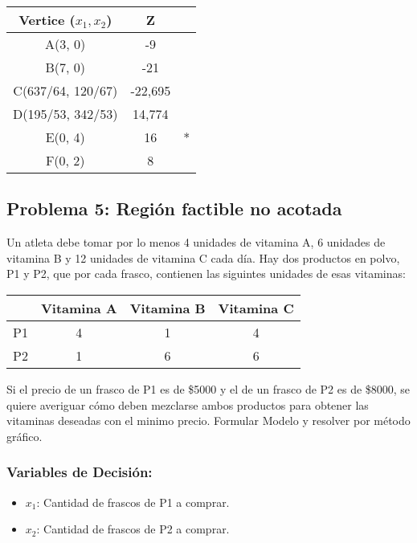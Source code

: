 \documentclass{templateNote}
\begin{document}
\begin{center}
    \begin{tabular}{|c|c|c|}
        \hline
        \textbf{Vertice ($x_1,x_2$)} & Z &  \\ \hline
        A(3, 0) & -9 & \\ \hline
        B(7, 0) & -21 & \\ \hline
        C(637/64, 120/67) & -22,695 & \\ \hline
        D(195/53, 342/53) & 14,774 & \\ \hline
        E(0, 4) & 16 & * \\ \hline
        F(0, 2) & 8 & \\ \hline
    \end{tabular}
\end{center}

\newpage
\subsection*{Problema 5: Región factible no acotada}
Un atleta debe tomar por lo menos 4 unidades de vitamina A, 6 unidades de vitamina B y 12 unidades de vitamina C cada día. Hay dos productos en polvo, P1 y P2, que por cada frasco, contienen las siguintes unidades de esas vitaminas:
\begin{center}
    \begin{tabular}{|c|c|c|c|}
        \hline
        & Vitamina A & Vitamina B & Vitamina C \\ \hline
        P1 & 4 & 1 & 4 \\ \hline
        P2 & 1 & 6 & 6 \\ \hline
    \end{tabular}
\end{center}

Si el precio de un frasco de P1 es de \$5000 y el de un frasco de P2 es de \$8000, se quiere averiguar cómo deben mezclarse ambos productos para obtener las vitaminas deseadas con el minimo precio. Formular Modelo y resolver por método gráfico.

\subsubsection*{Variables de Decisión:}
\begin{itemize}
    \item $x_1$: Cantidad de frascos de P1 a comprar.
    \item $x_2$: Cantidad de frascos de P2 a comprar.
\end{itemize}
\end{document}
